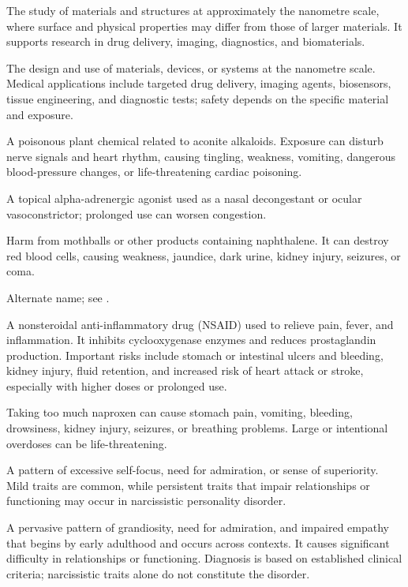  The study of materials and structures at approximately the nanometre scale, where surface and physical properties may differ from those of larger materials. It supports research in drug delivery, imaging, diagnostics, and biomaterials.

 The design and use of materials, devices, or systems at the nanometre scale. Medical applications include targeted drug delivery, imaging agents, biosensors, tissue engineering, and diagnostic tests; safety depends on the specific material and exposure.

 A poisonous plant chemical related to aconite alkaloids. Exposure can disturb nerve signals and heart rhythm, causing tingling, weakness, vomiting, dangerous blood-pressure changes, or life-threatening cardiac poisoning.

 A topical alpha-adrenergic agonist used as a nasal decongestant or ocular vasoconstrictor; prolonged use can worsen congestion.

 Harm from mothballs or other products containing naphthalene. It can destroy red blood cells, causing weakness, jaundice, dark urine, kidney injury, seizures, or coma.

 Alternate name; see .

 A nonsteroidal anti-inflammatory drug (NSAID) used to relieve pain, fever, and
inflammation. It inhibits cyclooxygenase enzymes and reduces prostaglandin production. Important risks
include stomach or intestinal ulcers and bleeding, kidney injury, fluid retention, and increased risk of
heart attack or stroke, especially with higher doses or prolonged use.

 Taking too much naproxen can cause stomach pain, vomiting, bleeding, drowsiness, kidney injury, seizures, or breathing problems. Large or intentional overdoses can be life-threatening.

 A pattern of excessive self-focus, need for admiration, or sense of superiority. Mild traits are common, while persistent traits that impair relationships or functioning may occur in narcissistic personality disorder.

 A pervasive pattern of grandiosity, need for admiration, and impaired empathy that begins by early adulthood and occurs across contexts. It causes significant difficulty in relationships or functioning. Diagnosis is based on established clinical criteria; narcissistic traits alone do not constitute the disorder.

